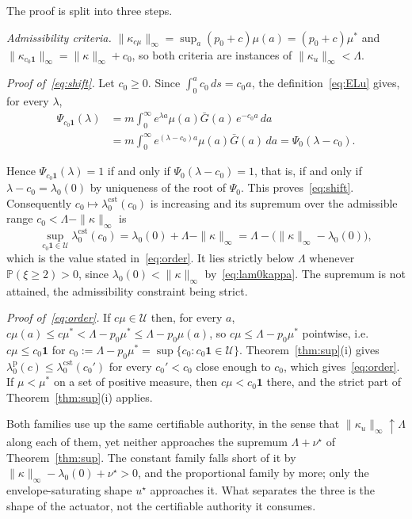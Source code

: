 \documentclass[letterpaper, 10pt, conference]{ieeeconf}
\makeatletter
\newcommand{\calU}{\mathcal{U}}
\newcommand{\Lbar}{\Lambda}
\newcommand{\rev}[1]{#1}
\newcommand{\pl}[1]{#1}
\renewenvironment{proof}[1][\proofname]{\par
  \pushQED{\qed}%
  \normalfont\topsep6\p@\@plus6\p@\relax
  \trivlist
  \item[\hskip\labelsep\itshape #1\@addpunct{.}]\ignorespaces
}{%
  \popQED\endtrivlist\@endpefalse
}
\renewenvironment{proof}[1][\proofname]{\par
  \pushQED{\qed}%
  \normalfont\topsep6\p@\@plus6\p@\relax
  \trivlist
  \item[\hskip\labelsep\itshape #1\@addpunct{.}]\ignorespaces
}{%
  \popQED\endtrivlist\@endpefalse
}
\makeatother
\begin{document}
\begin{proof}
\rev{The proof is split into three steps.

\pl{\emph{Admissibility criteria.}} $\|\kappa_{c\mu}\|_\infty=\sup_a(p_0+c)\mu(a)
=(p_0+c)\mu^\ast$ and $\|\kappa_{c_0\mathbf 1}\|_\infty=\|\kappa\|_\infty+c_0$,
so both criteria are instances of $\|\kappa_u\|_\infty<\Lbar$.}

\rev{\pl{\emph{Proof of~\eqref{eq:shift}.}} Let $c_0\ge0$. Since $\int_0^ac_0\,ds=c_0a$, the
definition~\eqref{eq:ELu} gives, for every $\lambda$,
\begin{align*}
\Psi_{c_0\mathbf 1}(\lambda)
&=m\int_0^\infty e^{\lambda a}\mu(a)\bar G(a)\,e^{-c_0a}\,da \\
&=m\int_0^\infty e^{(\lambda-c_0)a}\mu(a)\bar G(a)\,da
=\Psi_0(\lambda-c_0).
\end{align*}
}
\rev{Hence $\Psi_{c_0\mathbf 1}(\lambda)=1$ if and only if
$\Psi_0(\lambda-c_0)=1$, that is, if and only if $\lambda-c_0=\lambda_0(0)$ by
uniqueness of the root of $\Psi_0$. This proves~\eqref{eq:shift}.} \\
\rev{Consequently $c_0\mapsto\lambda_0^{\mathrm{cst}}(c_0)$ is increasing and
its supremum over the admissible range $c_0<\Lbar-\|\kappa\|_\infty$ is}
\[
\sup_{c_0\mathbf 1\in\calU}\lambda_0^{\mathrm{cst}}(c_0)
=\lambda_0(0)+\Lbar-\|\kappa\|_\infty
=\Lbar-\bigl(\|\kappa\|_\infty-\lambda_0(0)\bigr),
\]
\rev{which is the value stated in~\eqref{eq:order}. It lies strictly below
$\Lbar$ whenever $\mathbb P(\xi\ge2)>0$, since
$\lambda_0(0)<\|\kappa\|_\infty$ by~\eqref{eq:lam0kappa}. The supremum is not
attained, the admissibility constraint being strict.}

\rev{\pl{\emph{Proof of~\eqref{eq:order}.}} If $c\mu\in\calU$ then, for every $a$,
$c\mu(a)\le c\mu^\ast<\Lbar-p_0\mu^\ast\le\Lbar-p_0\mu(a)$, so
$c\mu\le\Lbar-p_0\mu^\ast$ pointwise, i.e.\ $c\mu\le c_0\mathbf 1$ for
$c_0:=\Lbar-p_0\mu^\ast=\sup\{c_0:c_0\mathbf 1\in\calU\}$. Theorem~\ref{thm:sup}(i)
gives $\lambda_0^{\mathrm p}(c)\le\lambda_0^{\mathrm{cst}}(c_0')$ for every
$c_0'<c_0$ close enough to $c_0$, \pl{which gives}~\eqref{eq:order}. If $\mu<\mu^\ast$ on
a set of positive measure, then $c\mu<c_0\mathbf 1$ there, and the strict part
of Theorem~\ref{thm:sup}(i) applies.}
\end{proof}

\rev{Both families \pl{use up} the same certifiable authority, in the sense that
$\|\kappa_u\|_\infty\uparrow\Lbar$ along each of them, yet neither approaches
the supremum $\Lbar+\nu^\star$ of Theorem~\ref{thm:sup}. The constant family
falls short of it by $\|\kappa\|_\infty-\lambda_0(0)+\nu^\star>0$, and the
proportional family by more; only the envelope-saturating shape $u^\star$
approaches it. What separates the three is the shape of the actuator, not the
certifiable authority it consumes.}
\end{document}
